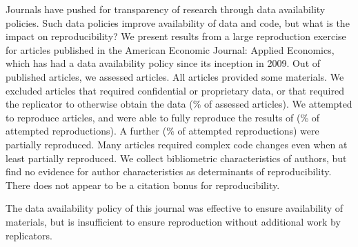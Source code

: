 

\noindent
Journals have pushed for transparency of research through data availability policies. Such data policies improve  availability of data and code, but what is the impact on reproducibility? We present results from a large reproduction exercise for  articles published in the American Economic Journal: Applied Economics, which has had a data availability policy since its inception in  2009. 
%
Out of  published articles, we assessed   articles. All articles provided some materials. We excluded  articles that required confidential or proprietary data, or that required the replicator to otherwise obtain the data (\% of assessed articles). 
%
We attempted to reproduce  articles, and were able to fully reproduce the results of   (\% of attempted reproductions). A further  (\% of attempted reproductions) were partially reproduced. Many articles required complex code changes even when at least partially reproduced. We collect bibliometric characteristics of authors, but find no  evidence for author  characteristics as determinants of reproducibility. There does not appear to be a citation bonus for reproducibility.

The data availability policy of this journal was effective to ensure availability of materials, but is insufficient to ensure reproduction without additional work by replicators. 